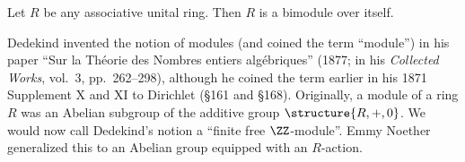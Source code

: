 \begin{example}
Let $R$ be any associative unital ring. 
Then $R$ is a bimodule over itself.
\end{example}

\begin{remark}
Dedekind invented the notion of modules (and coined the term
``module'') in his paper ``Sur la Th\'eorie des Nombres entiers alg\'ebriques'' (1877;
in his \textit{Collected Works}, vol.~3, pp.~262--298), although he
coined the term earlier in his 1871 Supplement X and XI to Dirichlet
(\S161 and \S168). Originally, a module of a ring $R$ was an Abelian
subgroup of the additive group $\structure{R,+,0}$. We would now call Dedekind's
notion a ``finite free $\ZZ$-module''. Emmy Noether generalized this to
an Abelian group equipped with an $R$-action.
\end{remark}